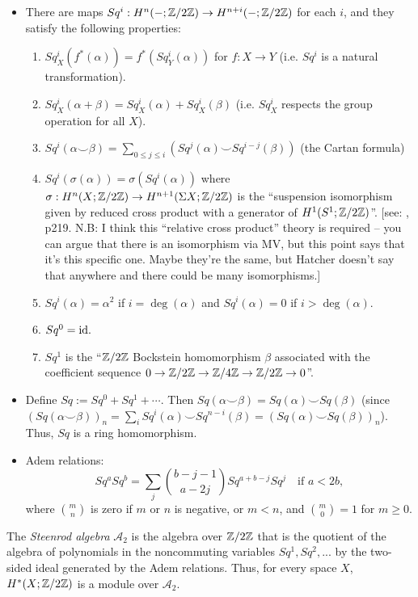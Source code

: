 \documentclass{MetricNotes2023}
\def\inte{\ensuremath\mathbb{Z}}
\def\id{\ensuremath\text{id}}
\begin{document}
\begin{itemize}
\item There are maps \(Sq^i : H^n(-; \inte/2\inte)\to H^{n+i}(- ; \inte/2\inte)\) for each \(i\), and they satisfy the following properties: \begin{enumerate}
\item \(Sq^i_X(f^*(\alpha))=f^*(Sq^i_Y(\alpha))\) for \(f : X \to Y\) (i.e. \(Sq^i\) is a natural transformation).
\item \(Sq^i_X(\alpha + \beta)=Sq^i_X(\alpha)+Sq^i_X(\beta)\) (i.e. \(Sq_X^i\) respects the group operation for all \(X\)).
\item \(Sq^i(\alpha \smile \beta)=\sum\limits_{0\leq j \leq i} (Sq^j(\alpha)\smile Sq^{i-j}(\beta))\) (the Cartan formula)
\item \(Sq^i(\sigma(\alpha))=\sigma(Sq^i(\alpha))\) where \(\sigma : H^n(X; \inte/2\inte)\to H^{n+1}(\Sigma X; \inte/2\inte)\) is the ``suspension isomorphism given by reduced cross product with a generator of \(H^1(S^1; \inte/2\inte)\)''. [see: \autocite{hatcher}, p219. N.B: I think this ``relative cross product'' theory is required -- you can argue that there is an isomorphism via MV, but this point says that it's this specific one. Maybe they're the same, but Hatcher doesn't say that anywhere and there could be many isomorphisms.]
\item \(Sq^i(\alpha)=\alpha^2\) if \(i=\deg(\alpha)\) and \(Sq^i(\alpha)=0\) if \(i> \deg(\alpha)\). 
\item \(Sq^0=\id.\)
\item \(Sq^1\) is the ``\(\inte/2\inte\) Bockstein homomorphism \(\beta\) associated with the coefficient sequence \(0 \to \inte/2\inte \to \inte/4\inte \to \inte/2\inte \to 0\)''. 
\end{enumerate}
\item Define \(Sq:=Sq^0+Sq^1+\cdots\). Then \(Sq(\alpha\smile \beta)=Sq(\alpha)\smile Sq(\beta)\) (since \((Sq(\alpha\smile \beta))_n=\sum_iSq^i(\alpha)\smile Sq^{n-i}(\beta)=(Sq(\alpha)\smile Sq(\beta))_n\)). Thus, \(Sq\) is a ring homomorphism. 
\item Adem relations:
\[Sq^aSq^b=\sum_j {b-j-1\choose a-2j}Sq^{a+b-j}Sq^j \quad \text{if } a<2b,\]
where \({m \choose n}\) is zero if \(m\) or \(n\) is negative, or \(m<n\), and \({m \choose 0}=1\) for \(m \geq 0\).
\end{itemize}

\begin{definition}
The \textit{Steenrod algebra} \(\mathscr{A}_2\) is the algebra over \(\inte/2\inte\) that is the quotient of the algebra of polynomials in the noncommuting variables \(Sq^1, Sq^2, ...\) by the two-sided ideal generated by the Adem relations. Thus, for every space \(X\), \(H^*(X; \inte/2\inte)\) is a module over \(\mathscr A_2\).
\end{definition}
\end{document}
